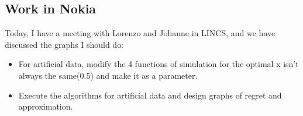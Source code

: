 \subsection*{Work in Nokia}
Today, I have a meeting with Lorenzo and Johanne in LINCS, and we have discussed the graphs I should do:
\begin{itemize}
	\item For artificial data, modify the 4 functions of simulation for the optimal x isn't always the same(0.5) and make it as a parameter.
	
	\item Execute the algorithms for artificial data and design graphs of regret and approximation.
\end{itemize}